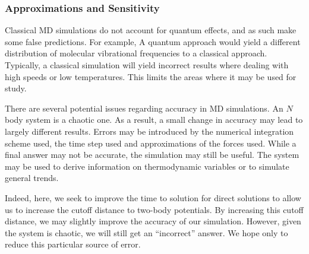 \subsubsection{Approximations and Sensitivity}

Classical MD simulations do not account for quantum effects,
and as such make some false predictions.
%
For example, A quantum approach would yield
a different distribution of
molecular vibrational frequencies to a classical approach.
%
Typically, a classical simulation will yield incorrect results
where dealing with high speeds or low temperatures.
%
This limits the areas where it may be used for study.

There are several potential issues regarding accuracy in MD simulations.
%
An $N$ body system is a chaotic one.
%
As a result, a small change in accuracy may lead to
largely different results.
%
Errors may be introduced by
the numerical integration scheme used,
the time step used and
approximations of the forces used.
%
While a final answer may not be accurate,
the simulation may still be useful.
%
The system may be used to derive information on
thermodynamic variables or to simulate general trends.

Indeed, here, we seek to improve the time to solution for direct solutions
to allow us to increase the cutoff distance to two-body potentials.
%
By increasing this cutoff distance, we may slightly improve the accuracy
of our simulation.
%
However, given the system is chaotic, we will
still get an ``incorrect'' answer.
%
We hope only to reduce this particular source of error.
